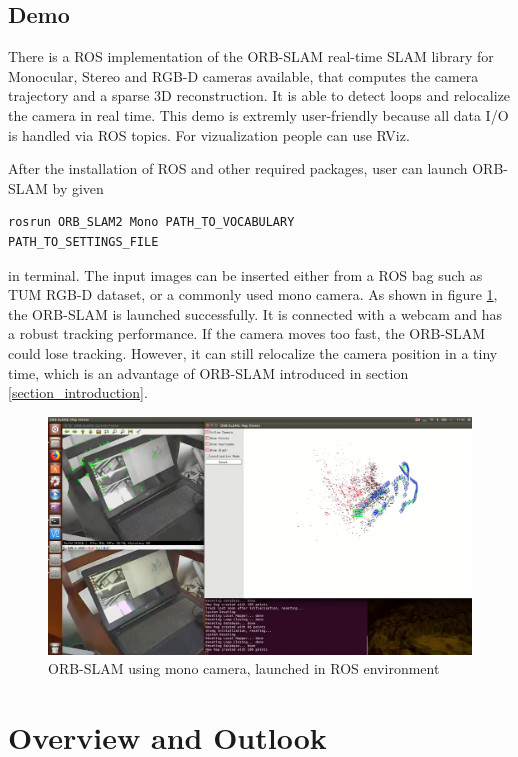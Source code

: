 \documentclass[letterpaper, 10 pt, conference]{ieeeconf}  %
\begin{document}
\subsection{Demo}
There is a ROS implementation of the ORB-SLAM real-time SLAM library for Monocular, Stereo and RGB-D cameras available, that computes the camera trajectory and a sparse 3D reconstruction. It is able to detect loops and relocalize the camera in real time. This demo is extremly user-friendly because all data I/O is handled via ROS topics. For vizualization people can use RViz. 

After the installation of ROS and other required packages, user can launch ORB-SLAM by given
%
\begin{lstlisting}
rosrun ORB_SLAM2 Mono PATH_TO_VOCABULARY 
PATH_TO_SETTINGS_FILE
\end{lstlisting}
%
in terminal. The input images can be inserted either from a ROS bag such as TUM RGB-D dataset, or a commonly used mono camera. As shown in figure \ref{example}, the ORB-SLAM is launched successfully. It is connected with a webcam and has a robust tracking performance. If the camera moves too fast, the ORB-SLAM could lose tracking. However, it can still relocalize the camera position in a tiny time, which is an advantage of ORB-SLAM introduced in section \ref{section_introduction}.


\begin{figure}[!htbp]
\centering
\includegraphics[scale=0.128]{./images/ORB_example}
\caption{ORB-SLAM using mono camera, launched in ROS environment}
\label{example}
\end{figure}


\section{Overview and Outlook}
\end{document}
